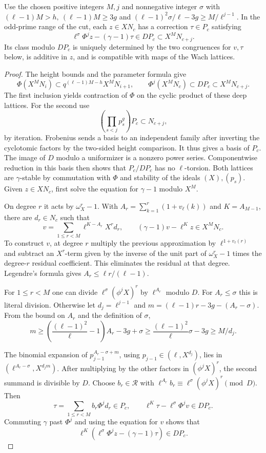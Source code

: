 \begin{lemma}
Use the chosen positive integers \(M,j\) and nonnegative integer
\(\sigma\) with \((\ell-1)M>h,\ (\ell-1)M\ge3g\) and
\((\ell-1)^2\sigma/\ell-3g\ge M/\ell^{j-1}\). In the odd-prime
range of the cut, each \(z\in XN_c\) has a correction \(\tau\in P_c\)
satisfying
\[
 \ell^\sigma\Phi^j z-(\gamma-1)\tau\in DP_c\subset X^M N_{c+j}.
\]
Its class modulo \(DP_c\) is uniquely determined by the two
congruences for \(v,\tau\) below, is additive in \(z\), and is
compatible with maps of the Wach lattices.
\end{lemma}
\begin{proof}
The height bounds and the parameter formula give
\[
 \Phi(X^M N_i)\subset q^{(\ell-1)M-h}X^MN_{i+1},\qquad
 \Phi^j(X^MN_c)\subset DP_c\subset X^MN_{c+j}.
\]
The first inclusion yields contraction of \(\Phi\) on the cyclic
product of these deep lattices. For the second use
\[
 (\prod_{s<j}p_s^g)P_c\subset N_{c+j},
\]
by iteration.
Frobenius sends a basis to an independent family after inverting
the cyclotomic factors by the two-sided height comparison. It thus
gives a basis of \(P_c\). The image of \(D\) modulo a uniformizer
is a nonzero power series. Componentwise reduction in this basis
then shows that \(P_c/DP_c\) has no \(\ell\)-torsion.
Both lattices are \(\gamma\)-stable by commutation with \(\Phi\)
and stability of the ideals \((X),(p_s)\).
Given \(z\in XN_c\), first solve the equation for
\(\gamma-1\) modulo \(X^M\).

On degree \(r\) it acts by
\(\omega_X^r-1\). With
\(A_r=\sum_{k=1}^r(1+v_\ell(k))\) and \(K=A_{M-1}\), there are
\(d_r\in N_c\) such that
\[
 v=\sum_{1\le r<M}\ell^{K-A_r}X^r d_r,\qquad
 (\gamma-1)v-\ell^K z\in X^M N_c.
\]
To construct \(v\), at degree \(r\) multiply the previous
approximation by \(\ell^{1+v_\ell(r)}\) and subtract an
\(X^r\)-term given by the inverse of the unit part of
\(\omega_X^r-1\) times the degree-\(r\) residual coefficient.
This eliminates the residual at that degree. Legendre's formula
gives \(A_r\le\ell r/(\ell-1)\).

For \(1\le r<M\) one can divide
\(\ell^\sigma(\phi^j X)^r\) by \(\ell^{A_r}\) modulo \(D\).
For \(A_r\le\sigma\) this is literal division. Otherwise let
\(d_j=\ell^{j-1}\) and
\(m=(\ell-1)r-3g-(A_r-\sigma)\). From the bound on \(A_r\)
and the definition of \(\sigma\),
\[
 m\ge\left(\frac{(\ell-1)^2}{\ell}-1\right)A_r-3g+\sigma
   \ge\frac{(\ell-1)^2}{\ell}\sigma-3g\ge M/d_j.
\]

The binomial expansion of \(p_{j-1}^{A_r-\sigma+m}\), using
\(p_{j-1}\in(\ell,X^{d_j})\), lies in
\((\ell^{A_r-\sigma},X^{d_j m})\).
After multiplying by the other factors in \((\phi^j X)^r\),
the second summand is divisible by \(D\). Choose \(b_r\in
\mathcal R\) with
\(\ell^{A_r} b_r\equiv\ell^\sigma(\phi^jX)^r\pmod{D}\).
Then
\[
 \tau=\sum_{1\le r<M} b_r\Phi^j d_r\in P_c,\qquad
 \ell^K\tau-\ell^\sigma\Phi^j v\in DP_c .
\]
Commuting \(\gamma\) past \(\Phi^j\) and using the equation for
\(v\) shows that
\[
 \ell^K(\ell^\sigma\Phi^j z-(\gamma-1)\tau)\in DP_c.
\]


\end{proof}
